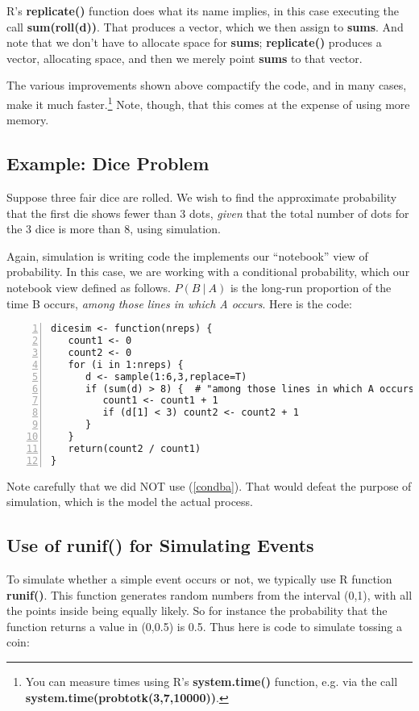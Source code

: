 R's {\bf replicate()} function does what its name implies, in this case
executing the call {\bf sum(roll(d))}.  That produces a vector, which we
then assign to {\bf sums}.  And note that we don't have to allocate space
for {\bf sums}; {\bf replicate()} produces a vector, allocating space,
and then we merely point {\bf sums} to that vector.

The various improvements shown above compactify the code, and in many
cases, make it much faster.\footnote{You can measure times using R's
{\bf system.time()} function, e.g. via the call {\bf
system.time(probtotk(3,7,10000))}.}  Note, though, that this comes at
the expense of using more memory.

\subsection{Example: Dice Problem}

Suppose three fair dice are rolled.  We wish to find the approximate
probability that the first die shows fewer than 3 dots, {\it given} that the
total number of dots for the 3 dice is more than 8, using simulation.

Again, simulation is writing code the implements our ``notebook'' view of
probability.  In this case, we are working with a conditional
probability, which our notebook view defined as follows.  $P(B ~|~ A)$
is the long-run proportion of the time B occurs, {\it among those lines
in which A occurs}.  Here is the code:

\begin{lstlisting}[numbers=left]
dicesim <- function(nreps) {
   count1 <- 0
   count2 <- 0
   for (i in 1:nreps) {
      d <- sample(1:6,3,replace=T)
      if (sum(d) > 8) {  # "among those lines in which A occurs"
         count1 <- count1 + 1
         if (d[1] < 3) count2 <- count2 + 1
      }
   }
   return(count2 / count1)
}
\end{lstlisting}

Note carefully that we did NOT use (\ref{condba}).  That would defeat
the purpose of simulation, which is the model the actual process.

\subsection{Use of runif() for Simulating Events}

To simulate whether a simple event occurs or not, we typically use R
function {\bf runif()}.  This function generates random numbers from the
interval (0,1), with all the points inside being equally likely.  So for
instance the probability that the function returns a value in (0,0.5) is
0.5.  Thus here is code to simulate tossing a coin:

